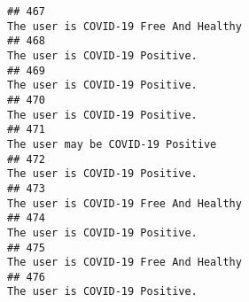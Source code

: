 \documentclass[
]{article}
\begin{document}
\begin{verbatim}
## 467                                                                                                                                                                                                                              The user is COVID-19 Free And Healthy
## 468                                                                                                                                                                                                                                     The user is COVID-19 Positive.
## 469                                                                                                                                                                                                                                     The user is COVID-19 Positive.
## 470                                                                                                                                                                                                                                     The user is COVID-19 Positive.
## 471                                                                                                                                                                                                                                  The user may be COVID-19 Positive
## 472                                                                                                                                                                                                                                     The user is COVID-19 Positive.
## 473                                                                                                                                                                                                                              The user is COVID-19 Free And Healthy
## 474                                                                                                                                                                                                                                     The user is COVID-19 Positive.
## 475                                                                                                                                                                                                                              The user is COVID-19 Free And Healthy
## 476                                                                                                                                                                                                                                     The user is COVID-19 Positive.

\end{verbatim}
\end{document}
